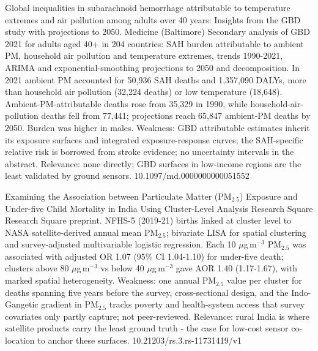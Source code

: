 \documentclass[10pt]{article}
\begin{document}
{Global inequalities in subarachnoid hemorrhage attributable to temperature extremes and air pollution among adults over 40 years: Insights from the GBD study with projections to 2050.}
{Medicine (Baltimore)}
{Secondary analysis of GBD 2021 for adults aged 40+ in 204 countries: SAH burden attributable to ambient PM, household air pollution and temperature extremes, trends 1990-2021, ARIMA and exponential-smoothing projections to 2050 and decomposition. In 2021 ambient PM accounted for 50,936 SAH deaths and 1,357,090 DALYs, more than household air pollution (32,224 deaths) or low temperature (18,648). Ambient-PM-attributable deaths rose from 35,329 in 1990, while household-air-pollution deaths fell from 77,441; projections reach 65,847 ambient-PM deaths by 2050. Burden was higher in males. Weakness: GBD attributable estimates inherit its exposure surfaces and integrated exposure-response curves; the SAH-specific relative risk is borrowed from stroke evidence; no uncertainty intervals in the abstract. Relevance: none directly; GBD surfaces in low-income regions are the least validated by ground sensors.}
{10.1097/md.0000000000051552}

\par{}\baselineskip{}\baselineskip
{}

{Examining the Association between Particulate Matter (PM$_{2.5}$) Exposure and Under-five Child Mortality in India Using Cluster-Level Analysis}
{Research Square}
{Research Square preprint. NFHS-5 (2019-21) births linked at cluster level to NASA satellite-derived annual mean PM$_{2.5}$; bivariate LISA for spatial clustering and survey-adjusted multivariable logistic regression. Each 10 $\mu$g\,m$^{-3}$ PM$_{2.5}$ was associated with adjusted OR 1.07 (95\% CI 1.04-1.10) for under-five death; clusters above 80 $\mu$g\,m$^{-3}$ vs below 40 $\mu$g\,m$^{-3}$ gave AOR 1.40 (1.17-1.67), with marked spatial heterogeneity. Weakness: one annual PM$_{2.5}$ value per cluster for deaths spanning five years before the survey, cross-sectional design, and the Indo-Gangetic gradient in PM$_{2.5}$ tracks poverty and health-system access that survey covariates only partly capture; not peer-reviewed. Relevance: rural India is where satellite products carry the least ground truth - the case for low-cost sensor co-location to anchor these surfaces.}
{10.21203/rs.3.rs-11731419/v1}
\end{document}
